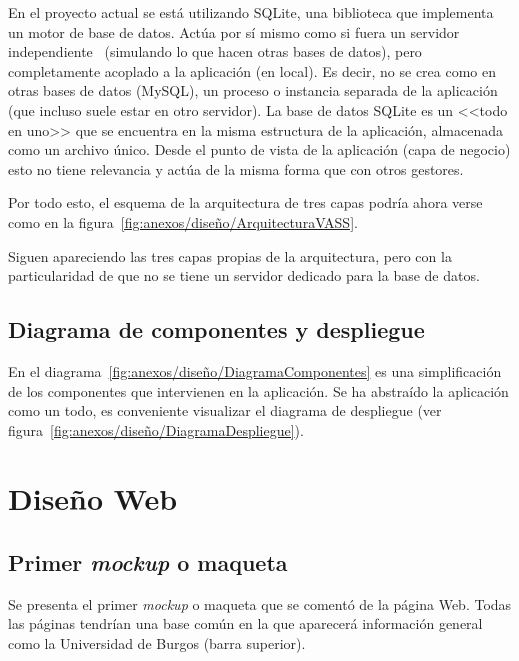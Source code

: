 En el proyecto actual se está utilizando SQLite, una biblioteca que implementa
un motor de base de datos. Actúa por sí mismo como si fuera un servidor
independiente~\cite{sqlite} (simulando lo que hacen otras bases de datos), pero
completamente acoplado a la aplicación (en local). Es decir, no se crea como en
otras bases de datos (MySQL), un proceso o instancia separada de la aplicación
(que incluso suele estar en otro servidor). La base de datos SQLite es un <<todo
en uno>> que se encuentra en la misma estructura de la aplicación, almacenada
como un archivo único. Desde el punto de vista de la aplicación (capa de
negocio) esto no tiene relevancia y actúa de la misma forma que con otros
gestores.

Por todo esto, el esquema de la arquitectura de tres capas podría ahora verse
como en la figura~\ref{fig:anexos/diseño/ArquitecturaVASS}.


Siguen apareciendo las tres capas propias de la arquitectura, pero con la
particularidad de que no se tiene un servidor dedicado para la base de datos.

\clearpage
\subsection{Diagrama de componentes y despliegue}
En el diagrama~\ref{fig:anexos/diseño/DiagramaComponentes} es una simplificación
de los componentes que intervienen en la aplicación. Se ha abstraído la
aplicación como un todo, es conveniente visualizar el diagrama de despliegue
(ver figura~\ref{fig:anexos/diseño/DiagramaDespliegue}).


\section{Diseño Web}

\subsection{Primer \textit{mockup} o maqueta} 

Se presenta el primer \textit{mockup} o maqueta que se comentó de la página Web.
Todas las páginas tendrían una base común en la que aparecerá información
general como la Universidad de Burgos (barra superior).

